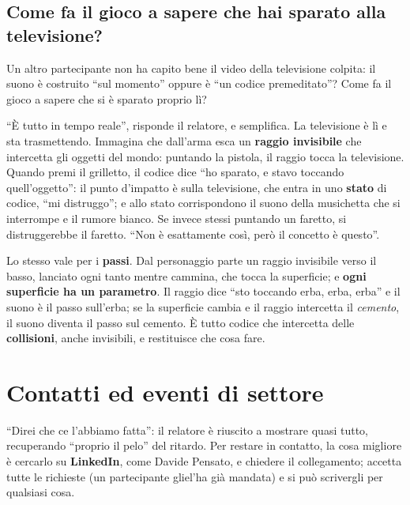 \subsection{Come fa il gioco a sapere che hai sparato alla televisione?}

Un altro partecipante non ha capito bene il video della televisione colpita: il
suono è costruito ``sul momento'' oppure è ``un codice premeditato''? Come fa il
gioco a sapere che si è sparato proprio lì?

``È tutto in tempo reale'', risponde il relatore, e semplifica. La televisione è
lì e sta trasmettendo. Immagina che dall'arma esca un \textbf{raggio invisibile}
che intercetta gli oggetti del mondo: puntando la pistola, il raggio tocca la
televisione. Quando premi il grilletto, il codice dice ``ho sparato, e stavo
toccando quell'oggetto'': il punto d'impatto è sulla televisione, che entra in
uno \textbf{stato} di codice, ``mi distruggo''; e allo stato corrispondono il
suono della musichetta che si interrompe e il rumore bianco. Se invece stessi
puntando un faretto, si distruggerebbe il faretto. ``Non è esattamente così,
però il concetto è questo''.

Lo stesso vale per i \textbf{passi}. Dal personaggio parte un raggio invisibile
verso il basso, lanciato ogni tanto mentre cammina, che tocca la superficie; e
\textbf{ogni superficie ha un parametro}. Il raggio dice ``sto toccando erba,
erba, erba'' e il suono è il passo sull'erba; se la superficie cambia e il raggio
intercetta il \emph{cemento}, il suono diventa il passo sul cemento. È tutto
codice che intercetta delle \textbf{collisioni}, anche invisibili, e restituisce
che cosa fare.

\section{Contatti ed eventi di settore}
\label{z9:sec:chiusura}

``Direi che ce l'abbiamo fatta'': il relatore è riuscito a mostrare quasi tutto,
recuperando ``proprio il pelo'' del ritardo. Per restare in contatto, la cosa
migliore è cercarlo su \textbf{LinkedIn}, come Davide Pensato, e chiedere il
collegamento; accetta tutte le richieste (un partecipante gliel'ha già mandata) e
si può scrivergli per qualsiasi cosa.

